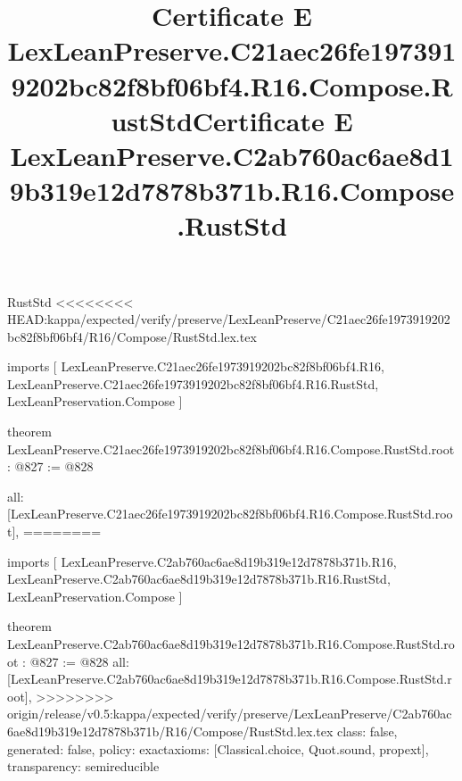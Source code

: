 \begin{lexlean}{RustStd}
<<<<<<<< HEAD:kappa/expected/verify/preserve/LexLeanPreserve/C21aec26fe1973919202bc82f8bf06bf4/R16/Compose/RustStd.lex.tex
\title{Certificate E LexLeanPreserve.C21aec26fe1973919202bc82f8bf06bf4.R16.Compose.RustStd}
\begin{coremodule}
imports [
  LexLeanPreserve.C21aec26fe1973919202bc82f8bf06bf4.R16,
  LexLeanPreserve.C21aec26fe1973919202bc82f8bf06bf4.R16.RustStd,
  LexLeanPreservation.Compose
]

theorem LexLeanPreserve.C21aec26fe1973919202bc82f8bf06bf4.R16.Compose.RustStd.root : @827 := @828 {
  all: [LexLeanPreserve.C21aec26fe1973919202bc82f8bf06bf4.R16.Compose.RustStd.root],
========
\title{Certificate E LexLeanPreserve.C2ab760ac6ae8d19b319e12d7878b371b.R16.Compose.RustStd}
\begin{coremodule}
imports [
  LexLeanPreserve.C2ab760ac6ae8d19b319e12d7878b371b.R16,
  LexLeanPreserve.C2ab760ac6ae8d19b319e12d7878b371b.R16.RustStd,
  LexLeanPreservation.Compose
]

theorem LexLeanPreserve.C2ab760ac6ae8d19b319e12d7878b371b.R16.Compose.RustStd.root : @827 := @828 {
  all: [LexLeanPreserve.C2ab760ac6ae8d19b319e12d7878b371b.R16.Compose.RustStd.root],
>>>>>>>> origin/release/v0.5:kappa/expected/verify/preserve/LexLeanPreserve/C2ab760ac6ae8d19b319e12d7878b371b/R16/Compose/RustStd.lex.tex
  class: false,
  generated: false,
  policy: exact{axioms: [Classical.choice, Quot.sound, propext]},
  transparency: semireducible
}


\end{coremodule}}
\end{coremodule}
\end{lexlean}
